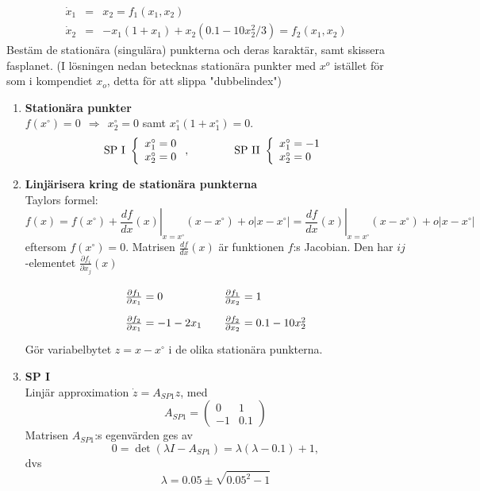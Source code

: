 \[
\begin{array}{ccl}
\dot{x}_1 &=& x_2 = f_1(x_1, x_2) \\
\dot{x}_2 &=& -x_1(1+x_1) + x_2(0.1-10x_2^2/3) = f_2(x_1, x_2)
\end{array}
\]
Bestäm de stationära (singulära) punkterna och deras karaktär, samt
skissera fasplanet. (I lösningen nedan betecknas stationära punkter med $x^o$ istället för som i kompendiet
$x_o$, detta för att slippa "dubbelindex")
\begin{enumerate}
\item {\bf Stationära punkter} \\
$f(x^\circ ) = 0\ \ \Rightarrow\ \ 
x{_2^\circ} = 0$ samt $x{_1^\circ} (1+x{^\circ _1}) = 0$.
$$
{\rm SP \  I}\ \left\{ \begin{array}{l} x{^\circ_1} = 0 \\ x{^\circ_2}
= 0 \end {array} \right. ,\qquad \qquad {\rm SP \ II}\  \left\{
\begin{array}{l} x{^\circ_1} = -1 \\ x{^\circ_2} = 0 \end{array}
\right.   
$$
\item {\bf Linjärisera kring de stationära punkterna} \\
Taylors formel:
$$
f(x) = f(x^\circ ) + \left. \frac{df}{dx}(x) \right|_{x=x^\circ}
(x-x^\circ) + o|x-x^\circ| = \left. \frac{df}{dx}(x) 
\right|_{x=x^\circ} (x-x^\circ) + o|x-x^\circ|
$$
eftersom $f(x^\circ )=0$.
Matrisen $\frac{df}{dx}(x)$ är funktionen $f$:s
Jacobian. Den har $ij$-elementet
$\frac{\partial f_i}{\partial x_j}(x)$
$$
\renewcommand{\arraystretch}{2}
\begin{array}{ll}
\frac{\partial f_1}{\partial x_1} = 0\ \ \ &
\frac{\partial f_1}{\partial x_2} = 1 \\
\frac{\partial f_2}{\partial x_1} = -1 -2 x_1 \ \ \ &
\frac{\partial f_2}{\partial x_2} = 0.1 - 10 x_2^2
\end{array}
\renewcommand{\arraystretch}{1}
$$
Gör variabelbytet $z = x - x^\circ$ i de olika
stationära punkterna.
\item {\bf SP I}\\
Linjär approximation $\dot{z} = A_{SP1}z$, med
$$
A_{SP1} = \begin{pmatrix} 0 & 1 \\ -1 & 0.1 \end{pmatrix}
$$
Matrisen $A_{SP1}$:s egenvärden ges av
\[0 = \det (\lambda I - A_{SP1}) = \lambda(\lambda-0.1) + 1,\]
dvs
\[ \lambda= 0.05 \pm \sqrt{0.05^2 - 1} \]


\end{enumerate}
